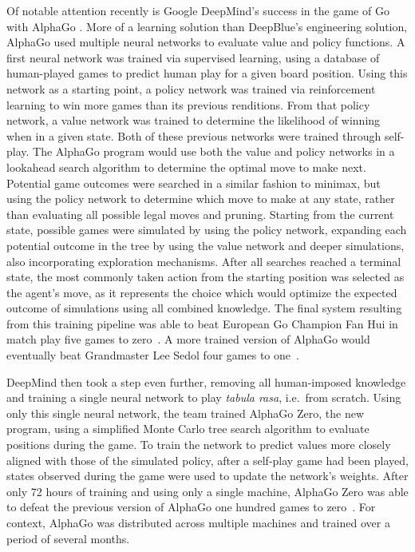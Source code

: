 Of notable attention recently is Google DeepMind's
success in the game of Go with AlphaGo
\cite{deepmind_alphago}.
%
More of a learning solution than DeepBlue's engineering solution,
AlphaGo used multiple neural networks to evaluate value and policy functions.
%
A first neural network was trained via supervised learning,
using a database of human-played games
to predict human play for a given board position.
%
Using this network as a starting point,
a policy network was trained via reinforcement learning
to win more games than its previous renditions.
%
From that policy network,
a value network was trained to determine the likelihood of winning when in a
given state.
%
Both of these previous networks were trained through self-play.
%
The AlphaGo program would use both the value and policy networks
in a lookahead search algorithm
to determine the optimal move to make next.
%
Potential game outcomes were searched in a similar fashion to minimax,
but using the policy network to determine which move to make at any state,
rather than evaluating all possible legal moves and pruning.
%
Starting from the current state,
possible games were simulated by using the policy network,
expanding each potential outcome in the tree by using the value network
and deeper simulations,
also incorporating exploration mechanisms.
%
After all searches reached a terminal state,
the most commonly taken action from the starting position was selected
as the agent's move,
as it represents the choice which would optimize the expected outcome of
simulations using all combined knowledge.
%
The final system resulting from this training pipeline was able to beat
European Go Champion Fan Hui in match play
five games to zero~\cite{deepmind_alphago}.
%
A more trained version of AlphaGo would eventually beat
Grandmaster Lee Sedol four games to one~\cite{deepmind_overview}.

DeepMind then took a step even further,
removing all human-imposed knowledge and
training a single neural network to play \textit{tabula rasa}, i.e.\  from scratch.
%
Using only this single neural network,
the team trained AlphaGo Zero,
the new program,
using a simplified Monte Carlo tree search algorithm to evaluate positions
during the game.
%
To train the network to predict values
more closely aligned with those of the simulated policy,
after a self-play game had been played,
states observed during the game were used to update
the network's weights.
%
After only 72 hours of training and using only a single machine,
AlphaGo Zero was able to defeat the previous version of AlphaGo
one hundred games to zero~\cite{deepmind_alphago_zero}.
%
For context,
AlphaGo was distributed across multiple machines
and trained over a period of several months.


